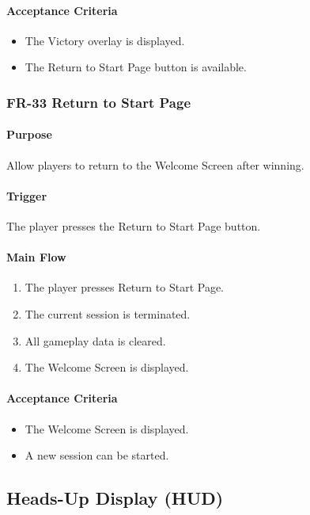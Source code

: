\documentclass[11pt,a4paper]{article}
\begin{document}
\paragraph{Acceptance Criteria}
\begin{itemize}
  \item The Victory overlay is displayed.
  \item The Return to Start Page button is available.
\end{itemize}

\subsubsection{FR-33 Return to Start Page}

\paragraph{Purpose}
Allow players to return to the Welcome Screen after winning.

\paragraph{Trigger}
The player presses the Return to Start Page button.

\paragraph{Main Flow}
\begin{enumerate}
  \item The player presses Return to Start Page.
  \item The current session is terminated.
  \item All gameplay data is cleared.
  \item The Welcome Screen is displayed.
\end{enumerate}

\paragraph{Acceptance Criteria}
\begin{itemize}
  \item The Welcome Screen is displayed.
  \item A new session can be started.
\end{itemize}

\subsection{Heads-Up Display (HUD)}
\end{document}
